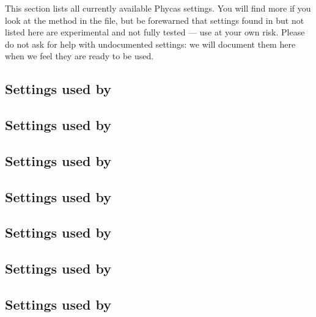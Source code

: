 This section lists all currently available Phycas settings. 
You will find more if you look at the  method in the  file, but be forewarned that settings found in  but not listed here are experimental and not fully tested --- use at your own risk.
Please do not ask for help with undocumented settings: we will document them here when we feel they are ready to be used.

\subsection{Settings used by }\label{subsec:likesettings}

\subsection{Settings used by }\label{subsec:mcmcsettings}

\subsection{Settings used by }\label{subsec:modelsettings}

\subsection{Settings used by }\label{subsec:randomtreesettings}

\subsection{Settings used by }\label{subsec:sssettings}

\subsection{Settings used by }\label{subsec:sumpsettings}

\subsection{Settings used by }\label{subsec:sumtsettings}
